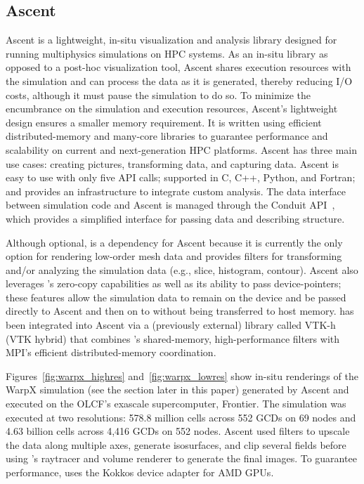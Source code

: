 \subsection{Ascent}

Ascent is a lightweight, in-situ visualization and analysis library designed for running multiphysics simulations on HPC systems. As an in-situ library as opposed to a post-hoc visualization tool, Ascent shares execution resources with the simulation and can process the data as it is generated, thereby reducing I/O costs, although it must pause the simulation to do so. To minimize the encumbrance on the simulation and execution resources, Ascent's lightweight design ensures a smaller memory requirement. It is written using efficient distributed-memory and many-core libraries to guarantee performance and scalability on current and next-generation HPC platforms. Ascent has three main use cases: creating pictures, transforming data, and capturing data. Ascent is easy to use with only five API calls; supported in C, C++, Python, and Fortran; and provides an infrastructure to integrate custom analysis.
The data interface between simulation code and Ascent is managed through the Conduit API~\citep{Harrison2022}, which provides a simplified interface for passing data and describing structure.

Although optional, \vtkm is a dependency for Ascent because it is currently the only option for rendering low-order mesh data and provides filters for transforming and/or analyzing the simulation data (e.g.,
slice, histogram, contour).
Ascent also leverages \vtkm's zero-copy capabilities as well as its ability to pass device-pointers; these features allow the simulation data to remain on the device and be passed directly to Ascent and then on to \vtkm without being transferred to host memory.
\vtkm has been integrated into Ascent via a (previously external) library called VTK-h (VTK hybrid) that combines \vtkm's shared-memory, high-performance filters with MPI's efficient distributed-memory coordination.

Figures~\ref{fig:warpx_highres} and~\ref{fig:warpx_lowres} show in-situ renderings of the WarpX simulation (see the  section later in this paper) generated by Ascent and executed on the OLCF's exascale supercomputer, Frontier.
The simulation was executed at two resolutions: 578.8 million cells across 552 GCDs on 69 nodes and 4.63 billion cells across 4,416 GCDs on 552 nodes.
Ascent used \vtkm filters to upscale the data along multiple axes, generate isosurfaces, and clip several fields before using \vtkm's raytracer and volume renderer to generate the final images.
To guarantee performance, \vtkm uses the Kokkos device adapter for AMD GPUs. 

